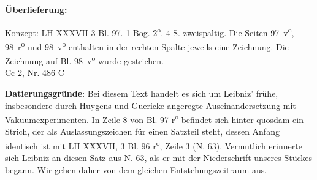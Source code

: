       
               
                \begin{ledgroupsized}[r]{120mm}
                \footnotesize 
                \pstart                
                \noindent\textbf{\"{U}berlieferung:}   
                \pend
                \end{ledgroupsized}
            
              
                            \begin{ledgroupsized}[r]{114mm}
                            \footnotesize 
                            \pstart \parindent -6mm
                            Konzept: LH XXXVII 3 Bl. 97. 1 Bog. 2\textsuperscript{o}. 4 S. zweispaltig. Die Seiten 97~v\textsuperscript{o}, 98~r\textsuperscript{o} und 98~v\textsuperscript{o} enthalten in der rechten Spalte jeweils eine Zeichnung. Die Zeichnung auf Bl. 98~v\textsuperscript{o} wurde gestrichen.\\Cc 2, Nr. 486 C \pend
                            \end{ledgroupsized}
                \vspace*{5mm}
                \begin{ledgroup}
                \footnotesize 
                \pstart
            \noindent\footnotesize{\textbf{Datierungsgr\"{u}nde}: Bei diesem Text handelt es sich um Leibniz' fr\"{u}he, insbesondere durch Huygens und Guericke angeregte Auseinandersetzung mit Vakuumexperimenten. In Zeile 8 von Bl. 97 r\textsuperscript{o} befindet sich hinter quosdam ein Strich, der als Auslassungszeichen f\"{u}r einen Satzteil steht, dessen Anfang identisch ist mit LH XXXVII, 3 Bl. 96 r\textsuperscript{o}, Zeile 3 (N. 63). %
            Vermutlich erinnerte sich Leibniz an diesen Satz aus N. 63, als er mit der Niederschrift unseres St\"{u}ckes begann. Wir gehen daher von dem gleichen Entstehungszeitraum aus.}
                \pend
                \end{ledgroup}
            
